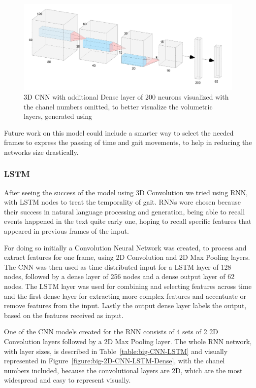 \documentclass[12pt]{article}
\theoremstyle{definition}
\begin{document}
	\begin{figure}
		\includegraphics[width=\textwidth]{networks/3D-CNN-200-Dense.png}
		\caption{3D CNN with additional Dense layer of 200 neurons visualized with the chanel numbers omitted, to better visualize the volumetric layers, generated using \cite{nn-svg}}
		\label{figure:3D-CNN-200-Dense}
	\end{figure}

	Future work on this model could include a smarter way to select the needed frames to express the passing of time and gait movements, to help in reducing the networks size drastically.

	\subsubsection{LSTM}

	After seeing the success of the model using 3D Convolution we tried using RNN, with LSTM nodes to treat the temporality of gait. RNNs wore chosen because their success in natural language processing and generation, being able to recall events happened in the text quite early one, hoping to recall specific features that appeared in previous frames of the input.

	For doing so initially a Convolution Neural Network was created, to process and extract features for one frame, using 2D Convolution and 2D Max Pooling layers. The CNN was then used as time distributed input for a LSTM layer of 128 nodes, followed by a dense layer of 256 nodes and a dense output layer of 62 nodes.
	The LSTM layer was used for combining and selecting features across time and the first dense layer for extracting more complex features and accentuate or remove features from the input. Lastly the output dense layer labels the output, based on the features received as input.

	One of the CNN models created for the RNN consists of 4 sets of 2 2D Convolution layers followed by a 2D Max Pooling layer. The whole RNN network, with layer sizes, is described in Table~\ref{table:big-CNN-LSTM} and visually represented in Figure~\ref{figure:big-2D-CNN-LSTM-Dense}, with the chanel numbers included, because the convolutional layers are 2D, which are the most widespread and easy to represent visually.
\end{document}
